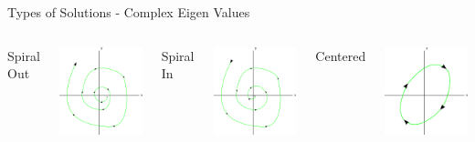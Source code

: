 \begin{frame}{Types of Solutions - Complex Eigen Values}

  \begin{columns}

    Spiral Out

    \includegraphics[width=4.5cm]{img/phasePlaneSpiralOut}

    Spiral In

    \includegraphics[width=4.5cm]{img/phasePlaneSpiralin}

    Centered

    \includegraphics[width=4.5cm]{img/phasePlaneCentered}

  \end{columns}
  
\end{frame}



